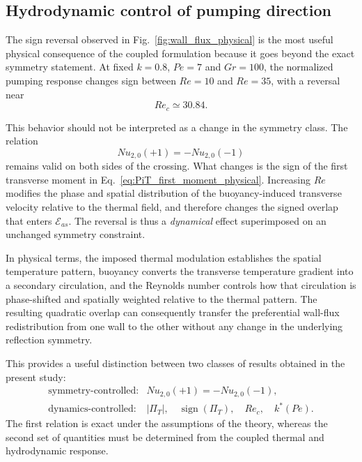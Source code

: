 \documentclass[12pt,a4paper]{article}
\newcommand{\Rey}{\mathit{Re}}
\newcommand{\Pe}{\mathit{Pe}}
\newcommand{\Grr}{\mathit{Gr}}
\newcommand{\Nu}{\mathit{Nu}}
\newcommand{\PiT}{\Pi_T}
\begin{document}
\subsection{Hydrodynamic control of pumping direction}
\label{subsec:reversal_physical}

The sign reversal observed in Fig.~\ref{fig:wall_flux_physical} is the most
useful physical consequence of the coupled formulation because it goes beyond
the exact symmetry statement. At fixed $k=0.8$, $\Pe=7$ and $\Grr=100$, the
normalized pumping response changes sign between $\Rey=10$ and $\Rey=35$,
with a reversal near
\begin{equation}
\Rey_c\simeq30.84.
\label{eq:Recritical_physical}
\end{equation}

This behavior should not be interpreted as a change in the symmetry class.
The relation
\begin{equation}
\Nu_{2,0}(+1)=-\Nu_{2,0}(-1)
\end{equation}
remains valid on both sides of the crossing. What changes is the sign of the
first transverse moment in Eq.~\eqref{eq:PiT_first_moment_physical}.
Increasing $\Rey$ modifies the phase and spatial distribution of the
buoyancy-induced transverse velocity relative to the thermal field, and
therefore changes the signed overlap that enters $\mathcal{E}_{as}$.
The reversal is thus a \emph{dynamical} effect superimposed on an unchanged
symmetry constraint.

In physical terms, the imposed thermal modulation establishes the spatial
temperature pattern, buoyancy converts the transverse temperature gradient
into a secondary circulation, and the Reynolds number controls how that
circulation is phase-shifted and spatially weighted relative to the thermal
pattern. The resulting quadratic overlap can consequently transfer the
preferential wall-flux redistribution from one wall to the other without any
change in the underlying reflection symmetry.

This provides a useful distinction between two classes of results obtained in
the present study:
\begin{equation}
\boxed{
\begin{array}{ll}
\text{symmetry-controlled:}
&
\Nu_{2,0}(+1)=-\Nu_{2,0}(-1),
\\[2mm]
\text{dynamics-controlled:}
&
|\PiT|,\quad
\operatorname{sign}(\PiT),\quad
\Rey_c,\quad
k^*(\Pe).
\end{array}}
\label{eq:symmetry_vs_dynamics}
\end{equation}
The first relation is exact under the assumptions of the theory, whereas the
second set of quantities must be determined from the coupled thermal and
hydrodynamic response.
\end{document}
